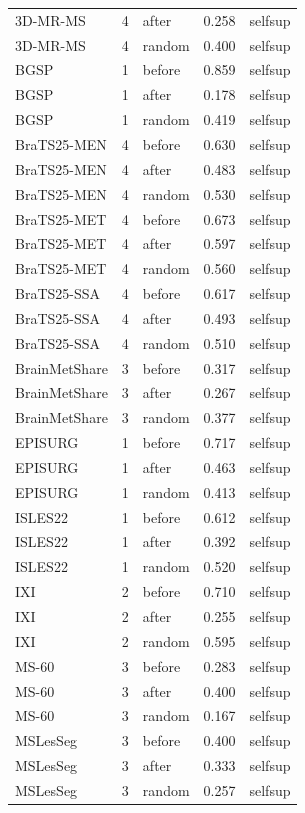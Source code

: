 \begin{tabular}{lrlrl}
3D-MR-MS & 4 & after & 0.258 & selfsup \\
3D-MR-MS & 4 & random & 0.400 & selfsup \\
BGSP & 1 & before & 0.859 & selfsup \\
BGSP & 1 & after & 0.178 & selfsup \\
BGSP & 1 & random & 0.419 & selfsup \\
BraTS25-MEN & 4 & before & 0.630 & selfsup \\
BraTS25-MEN & 4 & after & 0.483 & selfsup \\
BraTS25-MEN & 4 & random & 0.530 & selfsup \\
BraTS25-MET & 4 & before & 0.673 & selfsup \\
BraTS25-MET & 4 & after & 0.597 & selfsup \\
BraTS25-MET & 4 & random & 0.560 & selfsup \\
BraTS25-SSA & 4 & before & 0.617 & selfsup \\
BraTS25-SSA & 4 & after & 0.493 & selfsup \\
BraTS25-SSA & 4 & random & 0.510 & selfsup \\
BrainMetShare & 3 & before & 0.317 & selfsup \\
BrainMetShare & 3 & after & 0.267 & selfsup \\
BrainMetShare & 3 & random & 0.377 & selfsup \\
EPISURG & 1 & before & 0.717 & selfsup \\
EPISURG & 1 & after & 0.463 & selfsup \\
EPISURG & 1 & random & 0.413 & selfsup \\
ISLES22 & 1 & before & 0.612 & selfsup \\
ISLES22 & 1 & after & 0.392 & selfsup \\
ISLES22 & 1 & random & 0.520 & selfsup \\
IXI & 2 & before & 0.710 & selfsup \\
IXI & 2 & after & 0.255 & selfsup \\
IXI & 2 & random & 0.595 & selfsup \\
MS-60 & 3 & before & 0.283 & selfsup \\
MS-60 & 3 & after & 0.400 & selfsup \\
MS-60 & 3 & random & 0.167 & selfsup \\
MSLesSeg & 3 & before & 0.400 & selfsup \\
MSLesSeg & 3 & after & 0.333 & selfsup \\
MSLesSeg & 3 & random & 0.257 & selfsup \\

\end{tabular}
